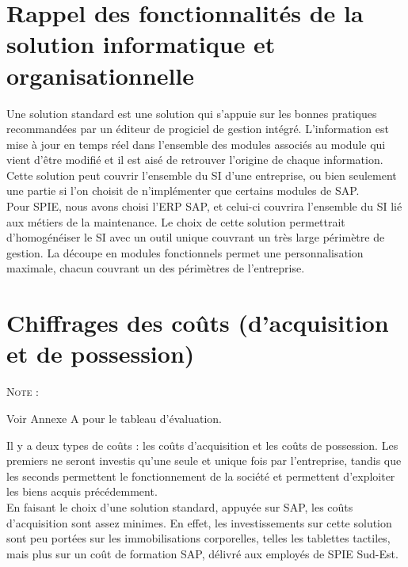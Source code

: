 \section{Rappel des fonctionnalités de la solution informatique et organisationnelle}

Une solution standard est une solution qui s’appuie sur les bonnes pratiques recommandées par un éditeur de progiciel de gestion intégré. L’information est mise à jour en temps réel dans l’ensemble des modules associés au module qui vient d’être modifié et il est aisé de retrouver l’origine de chaque information. Cette solution peut couvrir l’ensemble du SI d’une entreprise, ou bien seulement une partie si l’on choisit de n’implémenter que certains modules de SAP. \\

Pour SPIE, nous avons choisi l’ERP SAP, et celui-ci couvrira l’ensemble du SI lié aux métiers de la maintenance. Le choix de cette solution permettrait d’homogénéiser le SI avec un outil unique couvrant un très large périmètre de gestion. La découpe en modules fonctionnels permet une personnalisation maximale, chacun couvrant un des périmètres de l’entreprise.

\section{Chiffrages des coûts (d'acquisition et de possession)}

\begin{shaded}
\noindent\textsc{Note :} 

Voir Annexe A pour le tableau d'évaluation.
\end{shaded}

Il y a deux types de coûts : les coûts d’acquisition et les coûts de possession. Les premiers ne seront investis qu’une seule et unique fois par l’entreprise, tandis que les seconds permettent le fonctionnement de la société et permettent d’exploiter les biens acquis précédemment. \\

En faisant le choix d’une solution standard, appuyée sur SAP, les coûts d’acquisition sont assez minimes. En effet, les investissements sur cette solution sont peu portées sur les immobilisations corporelles, telles les tablettes tactiles, mais plus sur un coût de formation SAP, délivré aux employés de SPIE Sud-Est. \\


